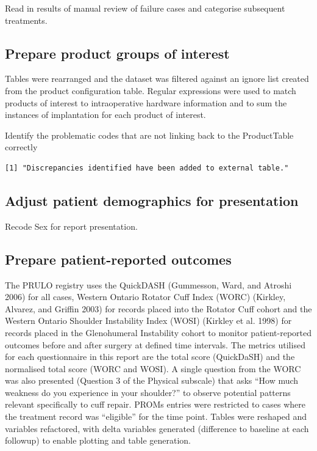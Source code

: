 \documentclass[
]{article}
\begin{document}
Read in results of manual review of failure cases and categorise
subsequent treatments.

\subsection{Prepare product groups of
interest}\label{prepare-product-groups-of-interest}

Tables were rearranged and the dataset was filtered against an ignore
list created from the product configuration table. Regular expressions
were used to match products of interest to intraoperative hardware
information and to sum the instances of implantation for each product of
interest.

Identify the problematic codes that are not linking back to the
ProductTable correctly

\begin{verbatim}
[1] "Discrepancies identified have been added to external table."
\end{verbatim}

\subsection{Adjust patient demographics for
presentation}\label{adjust-patient-demographics-for-presentation}

Recode Sex for report presentation.

\subsection{Prepare patient-reported
outcomes}\label{prepare-patient-reported-outcomes}

The PRULO registry uses the QuickDASH (Gummesson, Ward, and Atroshi
2006) for all cases, Western Ontario Rotator Cuff Index (WORC) (Kirkley,
Alvarez, and Griffin 2003) for records placed into the Rotator Cuff
cohort and the Western Ontario Shoulder Instability Index (WOSI)
(Kirkley et al. 1998) for records placed in the Glenohumeral Instability
cohort to monitor patient-reported outcomes before and after surgery at
defined time intervals. The metrics utilised for each questionnaire in
this report are the total score (QuickDaSH) and the normalised total
score (WORC and WOSI). A single question from the WORC was also
presented (Question 3 of the Physical subscale) that asks ``How much
weakness do you experience in your shoulder?'' to observe potential
patterns relevant specifically to cuff repair. PROMs entries were
restricted to cases where the treatment record was ``eligible'' for the
time point. Tables were reshaped and variables refactored, with delta
variables generated (difference to baseline at each followup) to enable
plotting and table generation.
\end{document}
